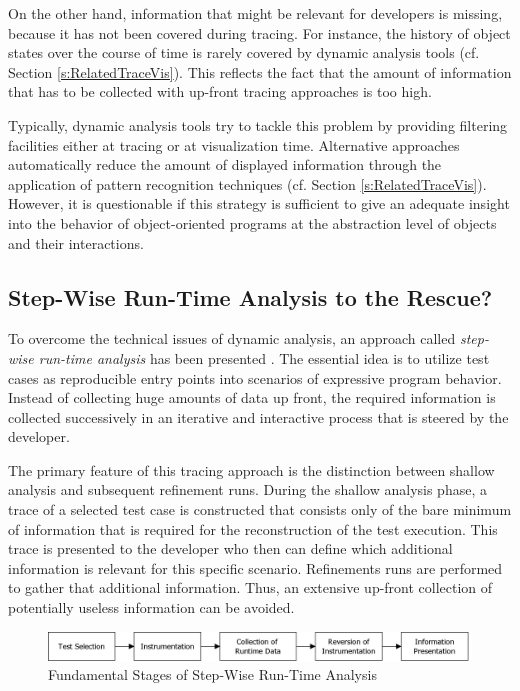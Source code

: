 On the other hand, information that might be relevant for developers is missing, because it has not been covered during tracing.
For instance, the history of object states over the course of time is rarely covered by dynamic analysis tools (cf. Section \ref{s:RelatedTraceVis}).
This reflects the fact that the amount of information that has to be collected with up-front tracing approaches is too high.

Typically, dynamic analysis tools try to tackle this problem by providing filtering facilities either at tracing or at visualization time.
Alternative approaches automatically reduce the amount of displayed information through the application of pattern recognition techniques (cf. Section \ref{s:RelatedTraceVis}).
However, it is questionable if this strategy is sufficient to give an adequate insight into the behavior of object-oriented programs at the abstraction level of objects and their interactions.

\subsection{Step-Wise Run-Time Analysis to the Rescue?}
\label{ss:BackgroundTracing}
To overcome the technical issues of dynamic analysis, an approach called \emph{step-wise run-time analysis} has been presented \citep{perscheid_immediacy_2010, perscheid_test-driven_2013}.
The essential idea is to utilize test cases as reproducible entry points into scenarios of expressive program behavior.
Instead of collecting huge amounts of data up front, the required information is collected successively in an iterative and interactive process that is steered by the developer.

The primary feature of this tracing approach is the distinction between shallow analysis and subsequent refinement runs.
During the shallow analysis phase, a trace of a selected test case is constructed that consists only of the bare minimum of information that is required for the reconstruction of the test execution.
This trace is presented to the developer who then can define which additional information is relevant for this specific scenario.
Refinements runs are performed to gather that additional information.
Thus, an extensive up-front collection of potentially useless information can be avoided.

\begin{figure}[tb]
	\centering
	\includegraphics[width=1.0\textwidth]{../images/02-TracingProcess}
	\caption{Fundamental Stages of Step-Wise Run-Time Analysis}
	\label{fig:BackgroundTracingApproach}
\end{figure}

